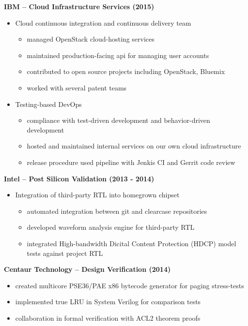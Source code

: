 \documentclass{report}
\begin{document}
  \textbf{IBM -- Cloud Infrastructure Services (2015)}
  \begin{itemize}
    \item Cloud continuous integration and continuous delivery team
    \begin{itemize}[label=$\circ$]
      \item managed OpenStack cloud-hosting services
      \item maintained production-facing api for managing user accounts
      \item contributed to open source projects including OpenStack, Bluemix
      \item worked with several patent teams
    \end{itemize}

    \item Testing-based DevOps
    \begin{itemize}[label=$\circ$]
      \item compliance with test-driven development and behavior-driven development
      \item hosted and maintained internal services on our own cloud infrastructure
      \item release procedure used pipeline with Jenkis CI and Gerrit code review
    \end{itemize}
  \end{itemize}

  \textbf{Intel -- Post Silicon Validation (2013 - 2014)}
  \begin{itemize}
  \item Integration of third-party RTL into homegrown chipset
  \begin{itemize}[label=$\circ$]
      \item automated integration between git and clearcase repositories
      \item developed waveform analysis engine for third-party RTL
      \item integrated High-bandwidth Dicital Content Protection (HDCP) model tests against project RTL
    \end{itemize}
  \end{itemize}

  \textbf{Centaur Technology -- Design Verification (2014)}
  \begin{itemize}[label=$\circ$]
    \item created multicore PSE36/PAE x86 bytecode generator for paging stress-tests
    \item implemented true LRU in System Verilog for comparison tests
    \item collaboration in formal verification with ACL2 theorem proofs
  \end{itemize}
\end{document}
